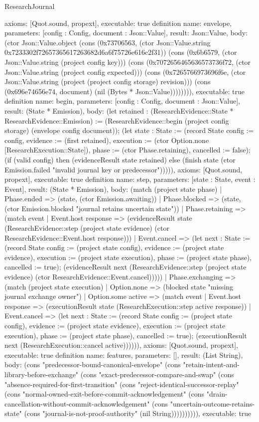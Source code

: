 \begin{lexlean}{ResearchJournal}
\begin{semanticmodule}
{ axioms: [Quot.sound, propext],
 executable: true
}
definition{
 name: envelope,
 parameters: [config : Config, document : Json::Value],
 result: Json::Value,
 body: (ctor Json::Value.object (cons (0x73706563, (ctor Json::Value.string 0x7233302f72657365617263682d6a6f75726e616c2f31)) (cons (0x6b6579, (ctor Json::Value.string (project config key))) (cons (0x7072656465636573736f72, (ctor Json::Value.string (project config expected))) (cons (0x7265766973696f6e, (ctor Json::Value.string (project (project config storage) revision))) (cons (0x696e74656e74, document) (nil (Bytes * Json::Value)))))))),
 executable: true
}
definition{
 name: begin,
 parameters: [config : Config, document : Json::Value],
 result: (State * Emission),
 body: (let retained : (ResearchEvidence::State * ResearchEvidence::Emission) := (ResearchEvidence::begin (project config storage) (envelope config document)); (let state : State := (record State {config := config, evidence := (first retained), execution := (ctor Option.none [ResearchExecution::State]), phase := (ctor Phase.retaining), cancelled := false}); (if (valid config) then (evidenceResult state retained) else (finish state (ctor Emission.failed "invalid journal key or predecessor"))))),
 axioms: [Quot.sound, propext],
 executable: true
}
definition{
 name: step,
 parameters: [state : State, event : Event],
 result: (State * Emission),
 body: (match (project state phase) | Phase.ended => (state, (ctor Emission.awaiting)) | Phase.blocked => (state, (ctor Emission.blocked "journal retains uncertain state")) | Phase.retaining => (match event | Event.host response => (evidenceResult state (ResearchEvidence::step (project state evidence) (ctor ResearchEvidence::Event.host response))) | Event.cancel => (let next : State := (record State {config := (project state config), evidence := (project state evidence), execution := (project state execution), phase := (project state phase), cancelled := true}); (evidenceResult next (ResearchEvidence::step (project state evidence) (ctor ResearchEvidence::Event.cancel))))) | Phase.exchanging => (match (project state execution) | Option.none => (blocked state "missing journal exchange owner") | Option.some active => (match event | Event.host response => (executionResult state (ResearchExecution::step active response)) | Event.cancel => (let next : State := (record State {config := (project state config), evidence := (project state evidence), execution := (project state execution), phase := (project state phase), cancelled := true}); (executionResult next (ResearchExecution::cancel active)))))),
 axioms: [Quot.sound, propext],
 executable: true
}
definition{
 name: features,
 parameters: [],
 result: (List String),
 body: (cons "predecessor-bound-canonical-envelope" (cons "retain-intent-and-library-before-exchange" (cons "exact-predecessor-compare-and-swap" (cons "absence-required-for-first-transition" (cons "reject-identical-successor-replay" (cons "normal-owned-exit-before-commit-acknowledgement" (cons "drain-cancellation-without-commit-acknowledgement" (cons "uncertain-outcome-retains-state" (cons "journal-is-not-proof-authority" (nil String)))))))))),
 executable: true
}
\end{semanticmodule}
\end{lexlean}
